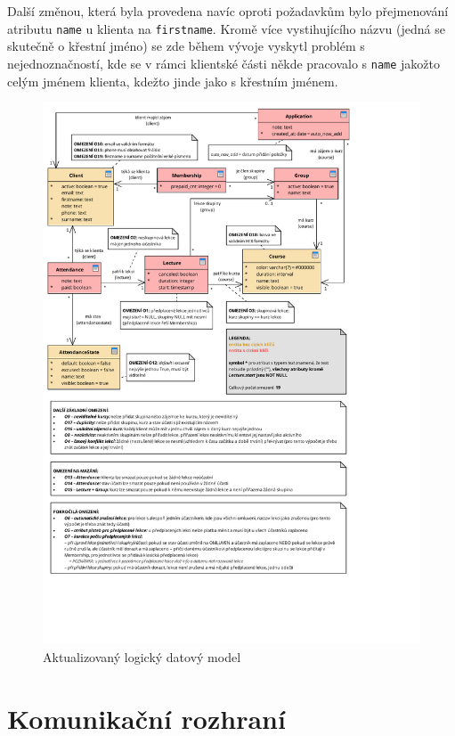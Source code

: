 Další změnou, která byla provedena navíc oproti požadavkům bylo přejmenování atributu \verb|name| u klienta na \verb|firstname|. Kromě více vystihujícího názvu (jedná se skutečně o křestní jméno) se zde během vývoje vyskytl problém s nejednoznačností, kde se v rámci klientské části někde pracovalo s \verb|name| jakožto celým jménem klienta, kdežto jinde jako s křestním jménem. 

\begin{figure}\centering
	\includegraphics[width=1\textwidth]{img/db-model}
	\caption[Aktualizovaný logický datový model]{Aktualizovaný logický datový model}\label{fig:db-model}
\vspace{-15pt}
\end{figure}

\section{Komunikační rozhraní}

